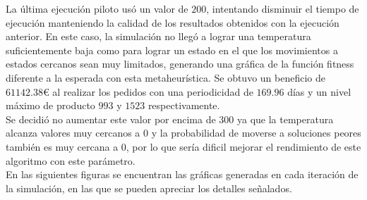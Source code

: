 \documentclass[a4paper,12pt]{article}
\begin{document}
	La última ejecución piloto usó un valor de $200$, intentando disminuir el tiempo de ejecución manteniendo la calidad de los resultados obtenidos con la ejecución anterior. En este caso, la simulación no llegó a lograr una temperatura suficientemente baja como para lograr un estado en el que los movimientos a estados cercanos sean muy limitados, generando una gráfica de la función fitness diferente a la esperada con esta metaheurística. Se obtuvo un beneficio de $61142.38$\euro \hspace{1mm} al realizar los pedidos con una periodicidad de $169.96$ días y un nivel máximo de producto $993$ y $1523$ respectivamente.\\
	
	Se decidió no aumentar este valor por encima de $300$ ya que la temperatura alcanza valores muy cercanos a $0$ y la probabilidad de moverse a soluciones peores también es muy cercana a $0$, por lo que sería dificil mejorar el rendimiento de este algoritmo con este parámetro.\\
	
	En las siguientes figuras se encuentran las gráficas generadas en cada iteración de la simulación, en las que se pueden apreciar los detalles señalados.
	
\end{document}
